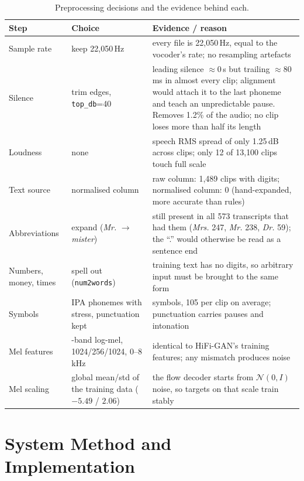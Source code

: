 \documentclass[11pt,a4paper]{article}
\begin{document}
\begin{table}[H]
\centering\small
\caption{Preprocessing decisions and the evidence behind each.}
\label{tab:preproc}
\begin{tabularx}{\linewidth}{@{}l>{\raggedright\arraybackslash}p{4.4cm}>{\raggedright\arraybackslash}X@{}}
\toprule
Step & Choice & Evidence / reason \\ \midrule
Sample rate & keep 22{,}050\,Hz & every file is 22{,}050\,Hz, equal to the vocoder's rate; no resampling artefacts \\
Silence & trim edges, \texttt{top\_db}=40 & leading silence $\approx$0\,s but trailing $\approx$80\,ms in almost every clip; alignment would attach it to the last phoneme and teach an unpredictable pause. Removes 1.2\% of the audio; no clip loses more than half its length \\
Loudness & none & speech RMS spread of only 1.25\,dB across clips; only 12 of 13{,}100 clips touch full scale \\
Text source & normalised column & raw column: 1{,}489 clips with digits; normalised column: 0 (hand-expanded, more accurate than rules) \\
Abbreviations & expand (\textit{Mr.} $\rightarrow$ \textit{mister}) & still present in all 573 transcripts that had them (\textit{Mrs.} 247, \textit{Mr.} 238, \textit{Dr.} 59); the ``.'' would otherwise be read as a sentence end \\
Numbers, money, times & spell out (\texttt{num2words}) & training text has no digits, so arbitrary input must be brought to the same form \\
Symbols & IPA phonemes with stress, punctuation kept & 55 symbols, 105 per clip on average; punctuation carries pauses and intonation \\
Mel features & 80-band log-mel, 1024/256/1024, 0--8\,kHz & identical to HiFi-GAN's training features; any mismatch produces noise \\
Mel scaling & global mean/std of the training data ($-5.49$ / $2.06$) & the flow decoder starts from $\mathcal N(0,I)$ noise, so targets on that scale train stably \\ \bottomrule
\end{tabularx}
\end{table}

\section{System Method and Implementation}\label{sec:design}
\end{document}

